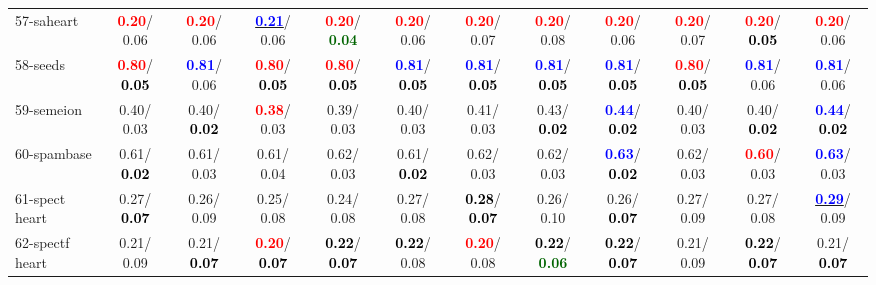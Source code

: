 \begin{table}[h]
\begin{center}
{\begin{tabular}{lc|c|c|c|c|c|c|c|c|c|c}
57-saheart & \textcolor{red}{\textbf{  0.20}}/  0.06 & \textcolor{red}{\textbf{  0.20}}/  0.06 & \underline{\textcolor{blue}{\textbf{  0.21}}}/  0.06 & \textcolor{red}{\textbf{  0.20}}/\textcolor{darkgreen}{\textbf{  0.04}} & \textcolor{red}{\textbf{  0.20}}/  0.06 & \textcolor{red}{\textbf{  0.20}}/  0.07 & \textcolor{red}{\textbf{  0.20}}/  0.08 & \textcolor{red}{\textbf{  0.20}}/  0.06 & \textcolor{red}{\textbf{  0.20}}/  0.07 & \textcolor{red}{\textbf{  0.20}}/\textcolor{black}{\textbf{  0.05}} & \textcolor{red}{\textbf{  0.20}}/  0.06 \\
58-seeds & \textcolor{red}{\textbf{  0.80}}/\textcolor{black}{\textbf{  0.05}} & \textcolor{blue}{\textbf{  0.81}}/  0.06 & \textcolor{red}{\textbf{  0.80}}/\textcolor{black}{\textbf{  0.05}} & \textcolor{red}{\textbf{  0.80}}/\textcolor{black}{\textbf{  0.05}} & \textcolor{blue}{\textbf{  0.81}}/\textcolor{black}{\textbf{  0.05}} & \textcolor{blue}{\textbf{  0.81}}/\textcolor{black}{\textbf{  0.05}} & \textcolor{blue}{\textbf{  0.81}}/\textcolor{black}{\textbf{  0.05}} & \textcolor{blue}{\textbf{  0.81}}/\textcolor{black}{\textbf{  0.05}} & \textcolor{red}{\textbf{  0.80}}/\textcolor{black}{\textbf{  0.05}} & \textcolor{blue}{\textbf{  0.81}}/  0.06 & \textcolor{blue}{\textbf{  0.81}}/  0.06 \\
59-semeion &   0.40/  0.03 &   0.40/\textcolor{black}{\textbf{  0.02}} & \textcolor{red}{\textbf{  0.38}}/  0.03 &   0.39/  0.03 &   0.40/  0.03 &   0.41/  0.03 &   0.43/\textcolor{black}{\textbf{  0.02}} & \textcolor{blue}{\textbf{  0.44}}/\textcolor{black}{\textbf{  0.02}} &   0.40/  0.03 &   0.40/\textcolor{black}{\textbf{  0.02}} & \textcolor{blue}{\textbf{  0.44}}/\textcolor{black}{\textbf{  0.02}} \\
60-spambase &   0.61/\textcolor{black}{\textbf{  0.02}} &   0.61/  0.03 &   0.61/  0.04 &   0.62/  0.03 &   0.61/\textcolor{black}{\textbf{  0.02}} &   0.62/  0.03 &   0.62/  0.03 & \textcolor{blue}{\textbf{  0.63}}/\textcolor{black}{\textbf{  0.02}} &   0.62/  0.03 & \textcolor{red}{\textbf{  0.60}}/  0.03 & \textcolor{blue}{\textbf{  0.63}}/  0.03 \\ \hline
61-spect heart &   0.27/\textcolor{black}{\textbf{  0.07}} &   0.26/  0.09 &   0.25/  0.08 &   0.24/  0.08 &   0.27/  0.08 & \textcolor{black}{\textbf{  0.28}}/\textcolor{black}{\textbf{  0.07}} &   0.26/  0.10 &   0.26/\textcolor{black}{\textbf{  0.07}} &   0.27/  0.09 &   0.27/  0.08 & \underline{\textcolor{blue}{\textbf{  0.29}}}/  0.09 \\
62-spectf heart &   0.21/  0.09 &   0.21/\textcolor{black}{\textbf{  0.07}} & \textcolor{red}{\textbf{  0.20}}/\textcolor{black}{\textbf{  0.07}} & \textcolor{black}{\textbf{  0.22}}/\textcolor{black}{\textbf{  0.07}} & \textcolor{black}{\textbf{  0.22}}/  0.08 & \textcolor{red}{\textbf{  0.20}}/  0.08 & \textcolor{black}{\textbf{  0.22}}/\textcolor{darkgreen}{\textbf{  0.06}} & \textcolor{black}{\textbf{  0.22}}/\textcolor{black}{\textbf{  0.07}} &   0.21/  0.09 & \textcolor{black}{\textbf{  0.22}}/\textcolor{black}{\textbf{  0.07}} &   0.21/\textcolor{black}{\textbf{  0.07}} \\

\end{tabular}}
\end{center}
\end{table}

